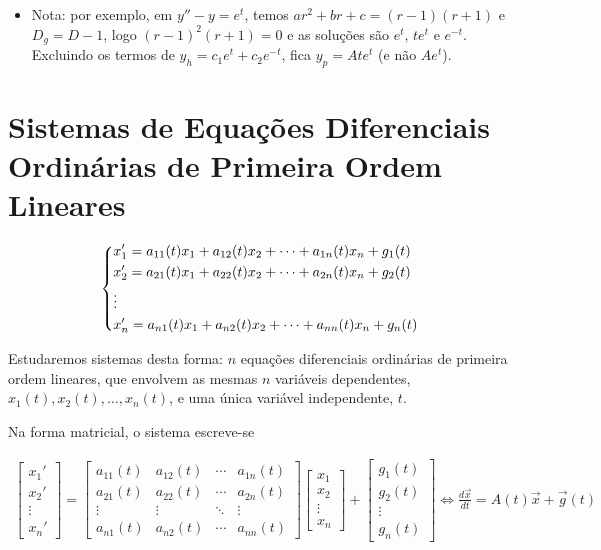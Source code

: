 \documentclass{article}
\begin{document}
\begin{itemize}
    \item Nota: por exemplo, em $y'' - y = e^t$, temos $ar^2 + br + c = (r - 1)(r + 1)$ e $D_g = D - 1$,
    logo $(r - 1)^2 (r + 1) = 0$ e as soluções são $e^t$, $t e^t$ e $e^{-t}$.
    Excluindo os termos de $y_h = c_1 e^t + c_2 e^{-t}$, fica $y_p = A t e^t$ (e não $A e^t$).
\end{itemize}

\newpage

\section{Sistemas de Equações Diferenciais Ordinárias de Primeira Ordem Lineares}
\label{sec: sistemas-edo-ordem1-lineares}

\begin{gather*}
\begin{dcases}
x_1' = a_{11}(t)x_1 + a_{12}(t)x_2 + \cdots + a_{1n}(t)x_n + g_1(t) \\
x_2' = a_{21}(t)x_1 + a_{22}(t)x_2 + \cdots + a_{2n}(t)x_n + g_2(t) \\
\vdots \\
x_n' = a_{n1}(t)x_1 + a_{n2}(t)x_2 + \cdots + a_{nn}(t)x_n + g_n(t)
\end{dcases}
\end{gather*}

Estudaremos sistemas desta forma: $n$ equações diferenciais ordinárias de primeira ordem lineares,
que envolvem as mesmas $n$ variáveis dependentes, $x_1(t), x_2(t), \ldots, x_n(t)$, e uma única variável
independente, $t$.

Na forma matricial, o sistema escreve-se

\begin{gather*}
\begin{bmatrix}
x_1' \\
x_2' \\
\vdots \\
x_n'
\end{bmatrix}
=
\begin{bmatrix}
a_{11}(t) & a_{12}(t) & \cdots & a_{1n}(t) \\
a_{21}(t) & a_{22}(t) & \cdots & a_{2n}(t) \\
\vdots & \vdots & \ddots & \vdots \\
a_{n1}(t) & a_{n2}(t) & \cdots & a_{nn}(t)
\end{bmatrix}
\begin{bmatrix}
x_1 \\
x_2 \\
\vdots \\
x_n
\end{bmatrix}
+
\begin{bmatrix}
g_1(t) \\
g_2(t) \\
\vdots \\
g_n(t)
\end{bmatrix}
\Leftrightarrow
\boxed{\frac{d\vec{x}}{dt} = A(t)\vec{x} + \vec{g}(t)}
\end{gather*}
\end{document}
